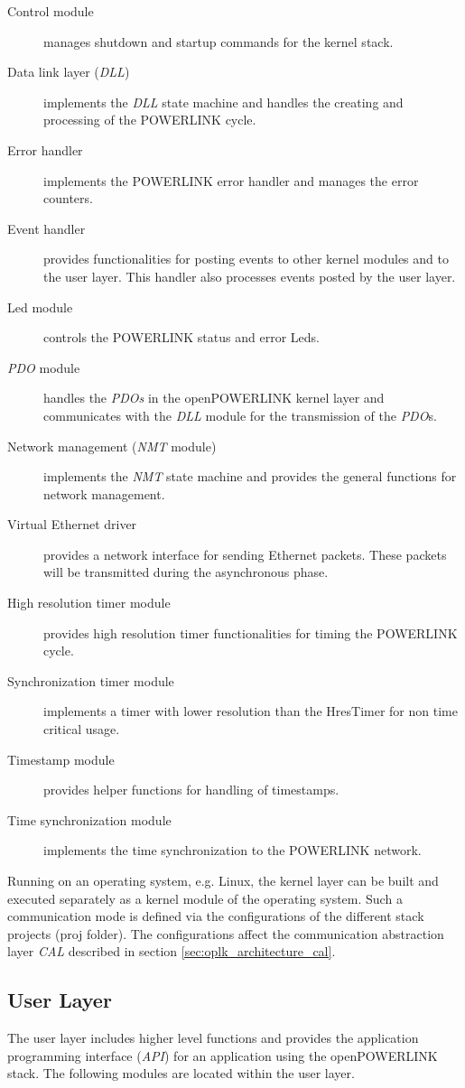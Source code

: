 \begin{description}
    \item[Control module] manages shutdown and startup commands for the kernel stack.
    \item[Data link layer (\emph{DLL})] implements the \emph{DLL} state machine and handles the creating and processing of the POWERLINK cycle.
    \item[Error handler] implements the POWERLINK error handler and manages the error counters.
    \item[Event handler] provides functionalities for posting events to other kernel modules and to the user layer.
    This handler also processes events posted by the user layer.
    \item[Led module] controls the POWERLINK status and error Leds.
    \item[\emph{PDO} module] handles the \emph{PDOs} in the openPOWERLINK kernel layer and communicates with the \emph{DLL} module for the transmission of the \emph{PDO}s.
    \item[Network management (\emph{NMT} module)] implements the \emph{NMT} state machine and provides the general functions for network management.
    \item[Virtual Ethernet driver] provides a network interface for sending Ethernet packets.
    These packets will be transmitted during the asynchronous phase.
    \item[High resolution timer module] provides high resolution timer functionalities for timing the POWERLINK cycle.
    \item[Synchronization timer module] implements a timer with lower resolution than the HresTimer for non time critical usage.
    \item[Timestamp module] provides helper functions for handling of timestamps.
    \item[Time synchronization module] implements the time synchronization to the POWERLINK network.
\end{description}

Running on an operating system, e.g. Linux, the kernel layer can be built and executed separately as a kernel module of the operating system.
Such a communication mode is defined via the configurations of the different stack projects (proj folder).
The configurations affect the communication abstraction layer \emph{CAL} described in section \ref{sec:oplk_architecture_cal}.

\subsection{User Layer}
\label{sec:oplk_architecture_user}
\begin{sloppypar}
The user layer includes higher level functions and provides the application programming interface (\emph{API}) for an application using the openPOWERLINK stack.
The following modules are located within the user layer. \cite[openPOWERLINK User Layer]{openpowerlink_doc}
\end{sloppypar}

